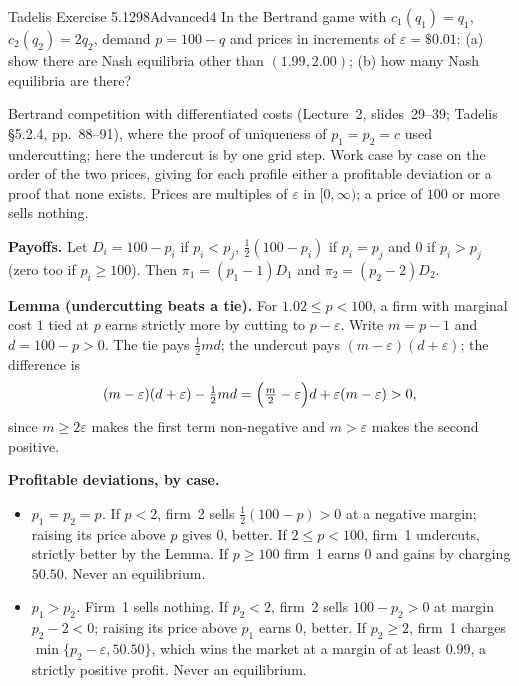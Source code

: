\begin{exsol}{Tadelis Exercise 5.12}{98}{Advanced}{4}
\asked In the Bertrand game with $c_1(q_1) = q_1$, $c_2(q_2) = 2q_2$, demand $p = 100 - q$ and prices in
increments of $\varepsilon = \$0.01$: (a) show there are Nash equilibria other than $(1.99, 2.00)$;
(b) how many Nash equilibria are there?

\method Bertrand competition with differentiated costs (Lecture~2, slides~29--39; Tadelis
\S5.2.4, pp.~88--91), where the proof of uniqueness of $p_1 = p_2 = c$ used undercutting; here the
undercut is by one grid step. Work case by case on the order of the two prices, giving for
each profile either a profitable deviation or a proof that none exists. Prices are multiples of
$\varepsilon$ in $[0, \infty)$; a price of $100$ or more sells nothing.

\solution
\textbf{Payoffs.} Let $D_i = 100 - p_i$ if $p_i < p_j$, $\tfrac12(100 - p_i)$ if $p_i = p_j$ and $0$ if $p_i > p_j$ (zero too if $p_i \ge 100$).
Then $\pi_1 = (p_1 - 1) D_1$ and $\pi_2 = (p_2 - 2) D_2$.

\textbf{Lemma (undercutting beats a tie).} For $1.02 \le p < 100$, a firm with marginal cost $1$ tied at $p$
earns strictly more by cutting to $p - \varepsilon$. Write $m = p - 1$ and $d = 100 - p > 0$. The tie pays $\tfrac12 m d$;
the undercut pays $(m - \varepsilon)(d + \varepsilon)$; the difference is
\[
  (m - \varepsilon)(d + \varepsilon) - \tfrac12 m d = \Bigl(\tfrac m2 - \varepsilon\Bigr) d + \varepsilon(m - \varepsilon) > 0,
\]
since $m \ge 2\varepsilon$ makes the first term non-negative and $m > \varepsilon$ makes the second positive.

\textbf{Profitable deviations, by case.}
\begin{itemize}
  \item \emph{$p_1 = p_2 = p$.} If $p < 2$, firm~2 sells $\tfrac12(100 - p) > 0$ at a negative margin; raising its price above $p$
  gives $0$, better. If $2 \le p < 100$, firm~1 undercuts, strictly better by the Lemma. If $p \ge 100$ firm~1 earns $0$ and gains by
  charging $50.50$. Never an equilibrium.
  \item \emph{$p_1 > p_2$.} Firm~1 sells nothing. If $p_2 < 2$, firm~2 sells $100 - p_2 > 0$ at margin $p_2 - 2 < 0$; raising its price
  above $p_1$ earns $0$, better. If $p_2 \ge 2$, firm~1 charges $\min\{p_2 - \varepsilon, 50.50\}$, which wins the market at a margin of
  at least $0.99$, a strictly positive profit. Never an equilibrium.
\end{itemize}


\end{exsol}
